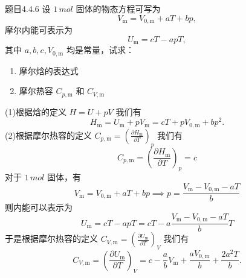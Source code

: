 \begin{question}{题目4.4.6}
    设 $1 \,\si{mol}$ 固体的物态方程可写为
    $$
        V_\mathrm{m} = V_\mathrm{0,m} + aT + bp,
    $$
    摩尔内能可表示为
    $$
        U_\mathrm{m} = cT - apT,
    $$
    其中 $a,b,c,V_\mathrm{0,m}$ 均是常量，试求：
    \begin{enumerate}
        \item[(1)] 摩尔焓的表达式
        \item[(2)] 摩尔热容 $C_{p,\mathrm{m}}$ 和 $C_{V,\mathrm{m}}$
    \end{enumerate}
\end{question}
\begin{solution}
    (1)根据焓的定义 $H = U + pV$ 我们有
    $$
        H_\mathrm{m} = U_\mathrm{m} + pV_\mathrm{m} = cT + pV_{0,\mathrm{m}} + bp^2.
    $$
    (2)根据摩尔热容的定义 $C_{p,\mathrm{m}} = \left( \frac{\partial H_\mathrm{m}}{\partial T}\right)_p$ 我们有
    $$
        C_{p,\mathrm{m}} = \left( \frac{\partial H_\mathrm{m}}{\partial T}\right)_p = c
    $$
    对于 $1 \,\si{mol}$ 固体，有
    $$
        V_\mathrm{m} = V_{0,\mathrm{m}} + aT + bp
        \implies
        p = \frac{V_\mathrm{m} - V_\mathrm{0,m} - aT}{b}
    $$
    则内能可以表示为
    $$
        U_\mathrm{m}
        = cT - apT
        = cT - a\frac{V_\mathrm{m} - V_\mathrm{0,m} - aT}{b}T
    $$
    于是根据摩尔热容的定义 $C_{V,\mathrm{m}} = \left( \frac{\partial U_\mathrm{m}}{\partial T}\right)_V$ 我们有
    $$
        C_{V,\mathrm{m}}
        = \left(\frac{\partial U_\mathrm{m}}{\partial T}\right)_V
        = c - \frac{a}{b}V_\mathrm{m} + \frac{aV_{0,\mathrm{m}}}{b} + \frac{2a^2T}{b}.
    $$
\end{solution}

